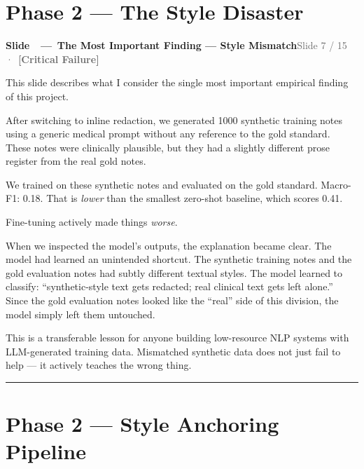\documentclass[11pt,a4paper]{article}
\newcommand{\phaselabel}[2]{\textbf{\textcolor{#1}{[#2]}}}
\newcounter{slidectr}
\newcommand{\slidescript}[3]{%
  \stepcounter{slidectr}
  \begin{slidebox}
    \noindent\textbf{Slide \theslidectr\ \,—\, #1}\hfill\small\textcolor{dimgray}{#2}
  \end{slidebox}
  \vspace{0.4em}
  #3
  \vspace{1.2em}
  \noindent\textcolor{dimgray!60}{\rule{\linewidth}{0.4pt}}
  \vspace{0.6em}
}
\begin{document}
\section{Phase 2 --- The Style Disaster}

\slidescript{The Most Important Finding — Style Mismatch}{Slide 7 / 15 \,·\, \phaselabel{danger}{Critical Failure}}{

This slide describes what I consider the single most important empirical finding of this project.

After switching to inline redaction, we generated 1000 synthetic training notes using a generic medical prompt without any reference to the gold standard. These notes were clinically plausible, but they had a slightly different prose register from the real gold notes.

We trained on these synthetic notes and evaluated on the gold standard. Macro-F1: 0.18. That is \emph{lower} than the smallest zero-shot baseline, which scores 0.41.

Fine-tuning actively made things \emph{worse}.

When we inspected the model's outputs, the explanation became clear. The model had learned an unintended shortcut. The synthetic training notes and the gold evaluation notes had subtly different textual styles. The model learned to classify: ``synthetic-style text gets redacted; real clinical text gets left alone.'' Since the gold evaluation notes looked like the ``real'' side of this division, the model simply left them untouched.

This is a transferable lesson for anyone building low-resource NLP systems with LLM-generated training data. Mismatched synthetic data does not just fail to help — it actively teaches the wrong thing.

}

\section{Phase 2 --- Style Anchoring Pipeline}
\end{document}
